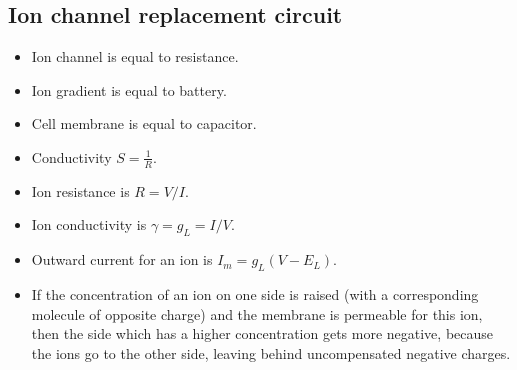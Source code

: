 \documentclass[a4paper, 12pt]{article}
\begin{document}
\subsection{Ion channel replacement circuit}
\begin{itemize}[noitemsep,nolistsep]
	\item Ion channel is equal to resistance.
	\item Ion gradient is equal to battery.
	\item Cell membrane is equal to capacitor.
	\item Conductivity $S=\frac{1}{R}$.
	\item Ion resistance is $R = V/I$.
	\item Ion conductivity is $\gamma = g_L = I/V$.
	\item Outward current for an ion is $I_m=g_L(V-E_L)$.
	\item If the concentration of an ion on one side is raised (with a corresponding molecule of opposite charge) and the membrane is permeable for this ion, then the side which has a higher concentration gets more negative, because the ions go to the other side, leaving behind uncompensated negative charges.
\end{itemize}
\begin{figure}[H]
	\centering
\end{figure}
\begin{figure}[H]
	\centering
\end{figure}
\end{document}
